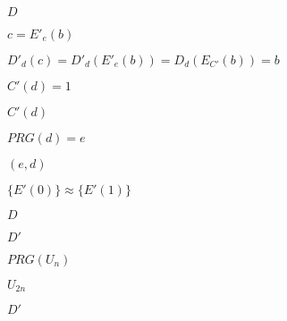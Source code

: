 \documentclass[10pt]{book}
\begin{document}
\begin{mdSnippets}
\begin{mdInlineSnippet}[f623e75af30e62bbd73d6df5b50bb7b5]%
$D$\end{mdInlineSnippet}%
\begin{mdInlineSnippet}[3e154c4bbbc10eb36329ca2e7975e712]%
$c = E'_e(b)$\end{mdInlineSnippet}%
\begin{mdInlineSnippet}[7132174b7822993a4bd785d953fc5556]%
$D'_d(c) = D'_d(E'_e(b)) = D_d(E_{C'}(b)) = b$\end{mdInlineSnippet}%
\begin{mdInlineSnippet}%
$C'(d) = 1$\end{mdInlineSnippet}%
\begin{mdInlineSnippet}[bdc092c5e5c3e00d33d6434972393e35]%
$C'(d)$\end{mdInlineSnippet}%
\begin{mdInlineSnippet}[5dcde13fa6b3b6c6d2dc1b999cc517e7]%
$PRG(d) = e$\end{mdInlineSnippet}%
\begin{mdInlineSnippet}%
$(e,d)$\end{mdInlineSnippet}%
\begin{mdInlineSnippet}[ae8ac7aeb17585f0e8f899a9922a3209]%
$\{ E'(0) \} \approx \{ E'(1) \}$\end{mdInlineSnippet}%
\begin{mdInlineSnippet}[f623e75af30e62bbd73d6df5b50bb7b5]%
$D$\end{mdInlineSnippet}%
\begin{mdInlineSnippet}[0232f27be40b2b647f260050dd308eb8]%
$D'$\end{mdInlineSnippet}%
\begin{mdInlineSnippet}%
$PRG(U_n)$\end{mdInlineSnippet}%
\begin{mdInlineSnippet}[f4d9591b1826b32bf817bf09af91b3ce]%
$U_{2n}$\end{mdInlineSnippet}%
\begin{mdInlineSnippet}[0232f27be40b2b647f260050dd308eb8]%
$D'$\end{mdInlineSnippet}%

\end{mdSnippets}
\end{document}
